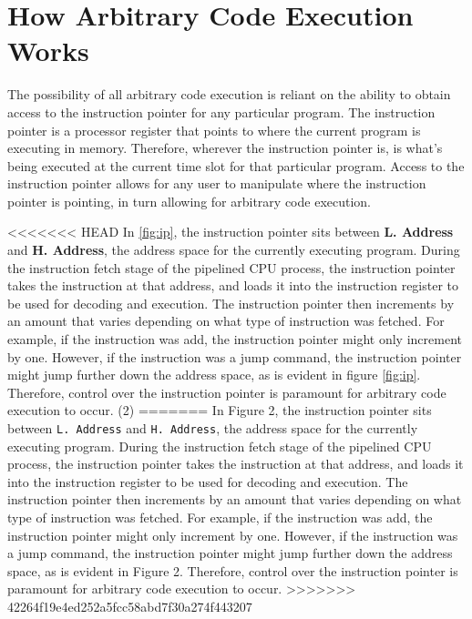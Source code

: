 \section{How Arbitrary Code Execution Works}

The possibility of all arbitrary code execution is reliant on the ability to obtain access to the instruction pointer for any particular program. The instruction pointer is a processor register that points to where the current program is executing in memory. Therefore, wherever the instruction pointer is, is what’s being executed at the current time slot for that particular program. Access to the instruction pointer allows for any user to manipulate where the instruction pointer is pointing, in turn allowing for arbitrary code execution. 

<<<<<<< HEAD
In \ref{fig:ip}, the instruction pointer sits between \textbf{L. Address} and \textbf{H. Address}, the address space for the currently executing program. During the instruction fetch stage of the pipelined CPU process, the instruction pointer takes the instruction at that address, and loads it into the instruction register to be used for decoding and execution. The instruction pointer then increments by an amount that varies depending on what type of instruction was fetched. For example, if the instruction was add, the instruction pointer might only increment by one. However, if the instruction was a jump command, the instruction pointer might jump further down the address space, as is evident in figure \ref{fig:ip}. Therefore, control over the instruction pointer is paramount for arbitrary code execution to occur. (2)
=======
In Figure 2, the instruction pointer sits between \texttt{L. Address} and \texttt{H. Address}, the address space for the currently executing program. During the instruction fetch stage of the pipelined CPU process, the instruction pointer takes the instruction at that address, and loads it into the instruction register to be used for decoding and execution. The instruction pointer then increments by an amount that varies depending on what type of instruction was fetched. For example, if the instruction was add, the instruction pointer might only increment by one. However, if the instruction was a jump command, the instruction pointer might jump further down the address space, as is evident in Figure 2. Therefore, control over the instruction pointer is paramount for arbitrary code execution to occur. \cite{instruction_pointer_1999}
>>>>>>> 42264f19e4ed252a5fcc58abd7f30a274f443207


